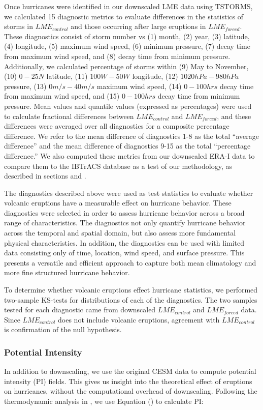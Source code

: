 \documentclass[phd,tocprelim]{cornell}
\begin{document}
Once hurricanes were identified in our downscaled LME data using
TSTORMS, we calculated 15 diagnostic metrics to evaluate differences
in the statistics of storms in $LME_{control}$ and those occurring
after large eruptions in $LME_{forced}$.  These diagnostics consist of
storm number vs (1) month, (2) year, (3) latitude, (4) longitude, (5)
maximum wind speed, (6) minimum pressure, (7) decay time from maximum
wind speed, and (8) decay time from minimum pressure. Additionally, we
calculated percentage of storms within (9) May to November, (10)
$0-25N$ latitude, (11) $100W-50W$ longitude, (12) $1020hPa-980hPa$
pressure, (13) $0m/s-40m/s$ maximum wind speed, (14) $0-100hrs$ decay
time from maximum wind speed, and (15) $0-100hrs$ decay time from
minimum pressure. Mean values and quantile values (expressed as
percentages) were used to calculate fractional differences between
$LME_{control}$ and $LME_{forced}$, and these differences were
averaged over all diagnostics for a composite percentage
difference. We refer to the mean difference of diagnostics 1-8 as the
total ``average difference'' and the mean difference of diagnostics
9-15 as the total ``percentage difference.'' We also computed these
metrics from our downscaled ERA-I data to compare them to the IBTrACS
database as a test of our methodology, as described in sections
 and .

The diagnostics described above were used as test statistics to
evaluate whether volcanic eruptions have a measurable effect on
hurricane behavior. These diagnostics were selected in order to assess
hurricane behavior across a broad range of characteristics. The
diagnostics not only quantify hurricane behavior across the temporal
and spatial domain, but also assess more fundamental physical
characteristics. In addition, the diagnostics can be used with limited
data consisting only of time, location, wind speed, and surface
pressure. This presents a versatile and efficient approach to capture
both mean climatology and more fine structured hurricane behavior.

To determine whether volcanic eruptions effect hurricane statistics,
we performed two-sample KS-tests for distributions of each of the
diagnostics. The two samples tested for each diagnostic came from
downscaled $LME_{control}$ and $LME_{forced}$ data. Since
$LME_{control}$ does not include volcanic eruptions, agreement with
$LME_{control}$ is confirmation of the null hypothesis.

\subsubsection{Potential Intensity}
In addition to downscaling, we use the original CESM data to compute
potential intensity (PI) fields. This gives us insight into the
theoretical effect of eruptions on hurricanes, without the
computational overhead of downscaling. Following the thermodynamic
analysis in \cite{pi_ke}, we use Equation () to calculate
PI:
\end{document}

